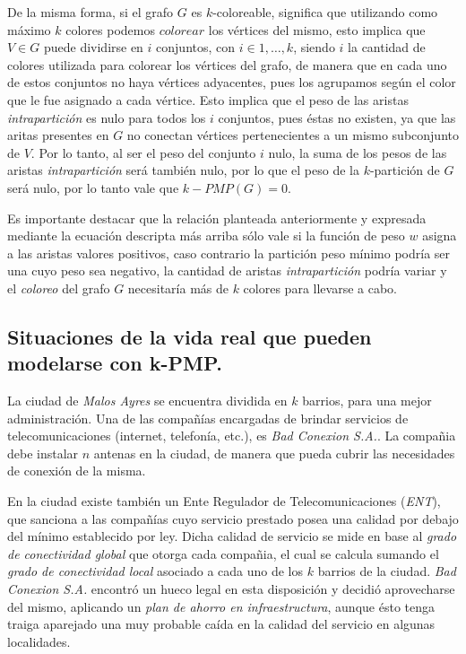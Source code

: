 De la misma forma, si el grafo $G$ es $k$-coloreable, significa que utilizando
como máximo $k$ colores podemos $colorear$ los vértices del mismo, esto implica
que $V \in G$ puede dividirse en $i$ conjuntos, con $i \in {1, \dots, k}$, siendo $i$
la cantidad de colores utilizada para colorear los vértices del grafo, de manera
que en cada uno de estos conjuntos no haya vértices adyacentes, pues los agrupamos
según el color que le fue asignado a cada vértice. Esto implica que el peso de
las aristas \textit{intrapartición} es nulo para todos los $i$ conjuntos, pues éstas no
existen, ya que las aritas presentes en $G$ no conectan vértices pertenecientes a
un mismo subconjunto de $V$. Por lo tanto, al ser el peso del conjunto $i$ nulo,
la suma de los pesos de las aristas \textit{intrapartición} será también nulo, por lo
que el peso de la $k$-partición de $G$ será nulo, por lo tanto vale que $k-PMP(G) = 0$.

Es importante destacar que la relación planteada anteriormente y expresada mediante
la ecuación descripta más arriba sólo vale si la función de peso $w$ asigna a las
aristas valores positivos, caso contrario la partición peso mínimo podría ser una
cuyo peso sea negativo, la cantidad de aristas \textit{intrapartición} podría variar y el
\textit{coloreo} del grafo $G$ necesitaría más de $k$ colores para llevarse a cabo.



\newpage
\subsection{Situaciones de la vida real que pueden modelarse con k-PMP.}
\vspace*{0.3cm}

La ciudad de \textit{Malos Ayres} se encuentra dividida en $k$ barrios, para una mejor administración. Una de las compañías encargadas de brindar servicios de telecomunicaciones (internet, telefonía, etc.), es \textit{Bad Conexion S.A.}.
La compañia debe instalar $n$ antenas en la ciudad, de manera que pueda cubrir las necesidades de conexión de la misma.

En la ciudad existe también un Ente Regulador de Telecomunicaciones (\textit{ENT}), que sanciona a las compañías cuyo servicio prestado posea una calidad por debajo del mínimo establecido por ley. Dicha calidad de servicio se mide en base al \textit{grado de conectividad global} que otorga cada compañia, el cual se calcula sumando el \textit{grado de conectividad local} asociado a cada uno de los $k$ barrios de la ciudad. \textit{Bad Conexion S.A.} encontró un hueco legal en esta disposición y decidió aprovecharse del mismo, aplicando un \textit{plan de ahorro en infraestructura}, aunque ésto tenga traiga aparejado una muy probable caída en la calidad del servicio en algunas localidades.

